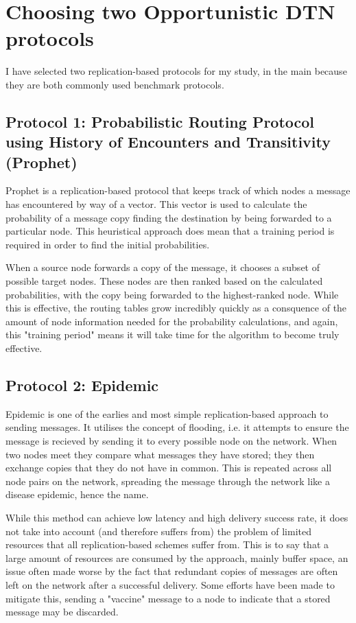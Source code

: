 \documentclass[12pt]{report}
\begin{document}
\section{Choosing two Opportunistic DTN protocols}
I have selected two replication-based protocols for my study, in the main because they are both commonly used benchmark protocols.

\subsection{Protocol 1: Probabilistic Routing Protocol using History of Encounters and Transitivity (Prophet)}
Prophet is a replication-based protocol that keeps track of which nodes a message has encountered by way of a vector.
This vector is used to calculate the probability of a message copy finding the destination by being forwarded to a particular node.
This heuristical approach does mean that a training period is required in order to find the initial probabilities.
\par
When a source node forwards a copy of the message, it chooses a subset of possible target nodes.
These nodes are then ranked based on the calculated probabilities, with the copy being forwarded to the highest-ranked node.\cite{prophetreport1}
While this is effective, the routing tables grow incredibly quickly as a consquence of the amount of node information needed for the probability calculations, and again, this "training period" means it will take time for the algorithm to become truly effective.

\subsection{Protocol 2: Epidemic}
Epidemic\cite{epidemicreport} is one of the earlies and most simple replication-based approach to sending messages.
It utilises the concept of flooding, i.e. it attempts to ensure the message is recieved by sending it to every possible node on the network.
When two nodes meet they compare what messages they have stored; they then exchange copies that they do not have in common.
This is repeated across all node pairs on the network, spreading the message through the network like a disease epidemic, hence the name.
\par
While this method can achieve low latency and high delivery success rate, it does not take into account (and therefore suffers from) the problem of limited resources that all replication-based schemes suffer from.
This is to say that a large amount of resources are consumed by the approach, mainly buffer space, an issue often made worse by the fact that redundant copies of messages are often left on the network after a successful delivery.
Some efforts have been made to mitigate this, sending a "vaccine" message to a node to indicate that a stored message may be discarded\cite{vaccines}.
\end{document}
